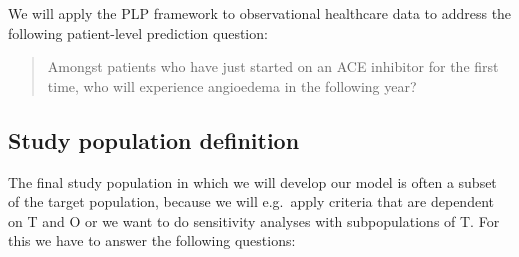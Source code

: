 \documentclass[]{book}
\begin{document}
We will apply the PLP framework to observational healthcare data to
address the following patient-level prediction question:

\begin{quote}
Amongst patients who have just started on an ACE inhibitor for the first
time, who will experience angioedema in the following year?
\end{quote}

\subsection{Study population
definition}\label{study-population-definition}

The final study population in which we will develop our model is often a
subset of the target population, because we will e.g.~apply criteria
that are dependent on T and O or we want to do sensitivity analyses with
subpopulations of T. For this we have to answer the following questions:
\end{document}
